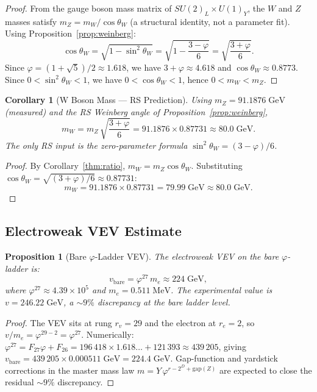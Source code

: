 \documentclass[12pt,a4paper]{article}
\newtheorem{corollary}[theorem]{Corollary}
\newtheorem{proposition}[theorem]{Proposition}
\theoremstyle{definition}
\theoremstyle{remark}
\begin{document}
\begin{proof}
From the gauge boson mass matrix of $SU(2)_L \times U(1)_Y$, the $W$
and $Z$ masses satisfy $m_Z = m_W/\cos\theta_W$ (a structural identity,
not a parameter fit).  Using Proposition~\ref{prop:weinberg}:
\[
  \cos\theta_W = \sqrt{1 - \sin^2\theta_W}
  = \sqrt{1 - \frac{3-\varphi}{6}} = \sqrt{\frac{3+\varphi}{6}}.
\]
Since $\varphi = (1+\sqrt{5})/2 \approx 1.618$, we have
$3 + \varphi \approx 4.618$ and $\cos\theta_W \approx 0.8773$.
Since $0 < \sin^2\theta_W < 1$, we have $0 < \cos\theta_W < 1$,
hence $0 < m_W < m_Z$.
\end{proof}

\begin{corollary}[W Boson Mass --- RS Prediction]
\label{thm:mW}
Using $m_Z = 91.1876\;\mathrm{GeV}$ (measured) and the RS Weinberg
angle of Proposition~\ref{prop:weinberg},
\begin{equation}
  \boxed{m_W = m_Z\,\sqrt{\frac{3+\varphi}{6}}
  = 91.1876 \times 0.87731
  \approx 80.0\;\mathrm{GeV}.}
\end{equation}
The only RS input is the zero-parameter formula $\sin^2\theta_W
= (3-\varphi)/6$.
\end{corollary}

\begin{proof}
By Corollary~\ref{thm:ratio}, $m_W = m_Z\cos\theta_W$.  Substituting
$\cos\theta_W = \sqrt{(3+\varphi)/6} \approx 0.87731$:
\[
  m_W = 91.1876 \times 0.87731 = 79.99\;\mathrm{GeV}
  \approx 80.0\;\mathrm{GeV}.
\]
\end{proof}

\subsection{Electroweak VEV Estimate}

\begin{proposition}[Bare $\varphi$-Ladder VEV]
\label{prop:vev}
The electroweak VEV on the bare $\varphi$-ladder is:
\begin{equation}
  v_{\mathrm{bare}} = \varphi^{27}\,m_e \approx 224\;\mathrm{GeV},
\end{equation}
where $\varphi^{27} \approx 4.39 \times 10^5$ and
$m_e = 0.511\;\mathrm{MeV}$.  The experimental value is
$v = 246.22\;\mathrm{GeV}$, a $\sim 9\%$ discrepancy at the bare
ladder level.
\end{proposition}

\begin{proof}
The VEV sits at rung $r_v = 29$ and the electron at $r_e = 2$, so
$v/m_e = \varphi^{29-2} = \varphi^{27}$.  Numerically:
$\varphi^{27} = F_{27}\varphi + F_{26} = 196\,418 \times 1.618\ldots
+ 121\,393 \approx 439\,205$, giving $v_{\mathrm{bare}} = 439\,205
\times 0.000511\;\mathrm{GeV} = 224.4\;\mathrm{GeV}$.  Gap-function
and yardstick corrections in the master mass law
$m = Y\,\varphi^{r - 2^D + \mathrm{gap}(Z)}$ are expected to close
the residual $\sim 9\%$ discrepancy.
\end{proof}
\end{document}

